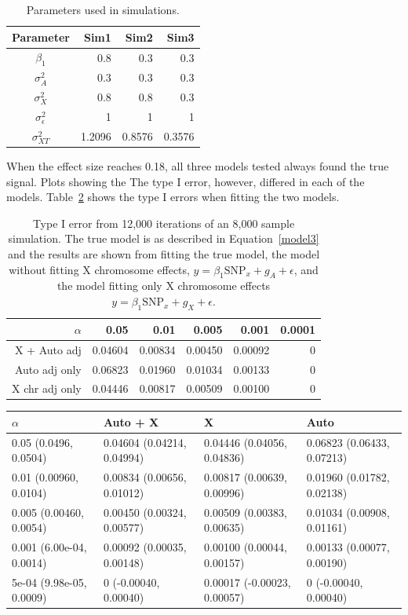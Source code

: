 \documentclass[11pt]{article} %
\newcommand{\snpX}{\mbox{SNP}_x}
\begin{document}
\begin{table}[ht]
\centering
\begin{tabular}{crrr}
\hline
Parameter & Sim1 & Sim2&Sim3\\ \hline
$\beta_1$& 0.8 &  0.3& 0.3\\ 
$\sigma_A^2$&0.3& 0.3& 0.3\\
$\sigma_X^2$&0.8 & 0.8& 0.3\\
$\sigma_{\epsilon}^2$&1& 1& 1\\\hline
$\sigma_{XT}^2$ & 1.2096& 0.8576& 0.3576\\ \hline
\end{tabular}
\caption{Parameters used in simulations.}
\label{params_sim}
\end{table} 
When the effect size reaches 0.18, all three models tested always found the true signal.
Plots showing the 
The type I error, however, differed in each of the models. Table~\ref{typeIerror} shows the type I errors when fitting the two models.

\bgroup
\def\arraystretch{1.5}
\begin{table}[ht]
\centering
\begin{tabular}{r|rrrrr}
  \hline
$\alpha$& 0.05 & 0.01 & 0.005 & 0.001 & 0.0001 \\ \hline
X + Auto adj & 0.04604 & 0.00834 & 0.00450 & 0.00092 & 0 \\ 
  Auto adj only & 0.06823 & 0.01960 & 0.01034 & 0.00133 & 0 \\ 
X chr adj only & 0.04446 & 0.00817 & 0.00509 & 0.00100 & 0 \\
   \hline
\end{tabular}
\caption{Type I error from 12,000 iterations of an 8,000 sample simulation. The true model is as described in Equation~\ref{model3} and the results are shown from fitting the true model, the model without fitting X chromosome effects, $y=\beta_1 \snpX + g_A + \epsilon$, and the model fitting only X chromosome effects $y=\beta_1 \snpX + g_X + \epsilon$.}\label{typeIerror}
\end{table} 


\begin{table}[ht]
\centering \small
\begin{tabular}{l|lll}
  \hline
 $\alpha$ & Auto + X & X & Auto \\ 
  \hline
0.05 (0.0496, 0.0504) & 0.04604 (0.04214, 0.04994) & 0.04446 (0.04056, 0.04836) & 0.06823 (0.06433, 0.07213) \\ 
0.01 (0.00960, 0.0104) & 0.00834 (0.00656, 0.01012) & 0.00817 (0.00639, 0.00996) & 0.01960 (0.01782, 0.02138) \\ 
0.005 (0.00460, 0.0054) & 0.00450 (0.00324, 0.00577) & 0.00509 (0.00383, 0.00635) & 0.01034 (0.00908, 0.01161) \\ 
0.001 (6.00e-04, 0.0014) & 0.00092 (0.00035, 0.00148) & 0.00100 (0.00044, 0.00157) & 0.00133 (0.00077, 0.00190) \\ 
 5e-04 (9.98e-05, 0.0009) & 0 (-0.00040, 0.00040) & 0.00017 (-0.00023, 0.00057) & 0 (-0.00040, 0.00040) \\ 
   \hline
\end{tabular}
\end{table}
\end{document}
